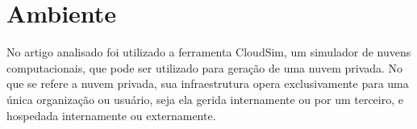 \section{Ambiente}

No artigo analisado foi utilizado a ferramenta CloudSim, um simulador de nuvens computacionais,
que pode ser utilizado para geração de uma nuvem privada. No que se refere a nuvem privada,
sua infraestrutura opera exclusivamente para uma única organização ou usuário, seja ela gerida
internamente ou por um terceiro, e hospedada internamente ou externamente.
